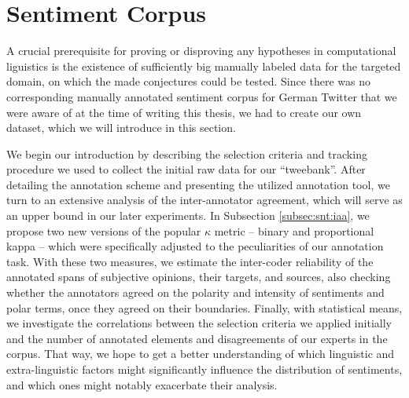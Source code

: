 

\section{Sentiment Corpus}\label{sec:snt:corpus}

A crucial prerequisite for proving or disproving any hypotheses in
computational liguistics is the existence of sufficiently big manually
labeled data for the targeted domain, on which the made conjectures
could be tested.  Since there was no corresponding manually annotated
sentiment corpus for German Twitter that we were aware of at the time
of writing this thesis, we had to create our own dataset, which we
will introduce in this section.

We begin our introduction by describing the selection criteria and
tracking procedure we used to collect the initial raw data for our
``tweebank''.  After detailing the annotation scheme and presenting
the utilized annotation tool, we turn to an extensive analysis of the
inter-annotator agreement, which will serve as an upper bound in our
later experiments.  In Subsection \ref{subsec:snt:iaa}, we propose two
new versions of the popular $\kappa$ metric \cite{Cohen:60} -- binary
and proportional kappa -- which were specifically adjusted to the
peculiarities of our annotation task.  With these two measures, we
estimate the inter-coder reliability of the annotated spans of
subjective opinions, their targets, and sources, also checking whether
the annotators agreed on the polarity and intensity of sentiments and
polar terms, once they agreed on their boundaries.  Finally, with
statistical means, we investigate the correlations between the
selection criteria we applied initially and the number of annotated
elements and disagreements of our experts in the corpus.  That way, we
hope to get a better understanding of which linguistic and
extra-linguistic factors might significantly influence the
distribution of sentiments, and which ones might notably exacerbate
their analysis.

